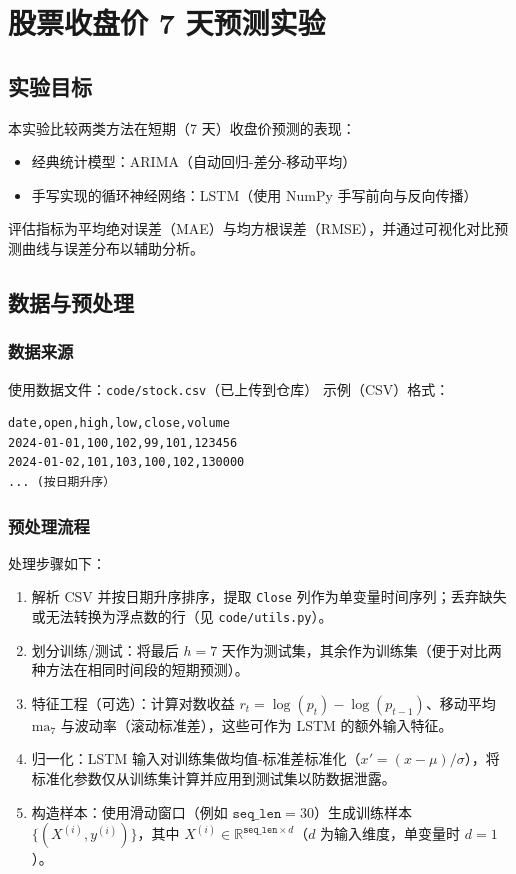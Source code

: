 \chapter{股票收盘价 7 天预测实验}

\section{实验目标}
本实验比较两类方法在短期（7 天）收盘价预测的表现：
\begin{itemize}
    \item 经典统计模型：ARIMA（自动回归-差分-移动平均）
    \item 手写实现的循环神经网络：LSTM（使用 NumPy 手写前向与反向传播）
\end{itemize}
评估指标为平均绝对误差（MAE）与均方根误差（RMSE），并通过可视化对比预测曲线与误差分布以辅助分析。

\section{数据与预处理}
\subsection{数据来源}
使用数据文件：\texttt{code/stock.csv}（已上传到仓库）
示例（CSV）格式：
\begin{lstlisting}[style=cleanpython]
date,open,high,low,close,volume
2024-01-01,100,102,99,101,123456
2024-01-02,101,103,100,102,130000
... (按日期升序）    
\end{lstlisting}

\subsection{预处理流程}
处理步骤如下：
\begin{enumerate}
    \item 解析 CSV 并按日期升序排序，提取 \texttt{Close} 列作为单变量时间序列；丢弃缺失或无法转换为浮点数的行（见 \texttt{code/utils.py}）。
    \item 划分训练/测试：将最后 $h=7$ 天作为测试集，其余作为训练集（便于对比两种方法在相同时间段的短期预测）。
    \item 特征工程（可选）：计算对数收益 $r_t=\log(p_t)-\log(p_{t-1})$、移动平均 $\mathrm{ma}_7$ 与波动率（滚动标准差），这些可作为 LSTM 的额外输入特征。
    \item 归一化：LSTM 输入对训练集做均值-标准差标准化（$x'=(x-\mu)/\sigma$），将标准化参数仅从训练集计算并应用到测试集以防数据泄露。
    \item 构造样本：使用滑动窗口（例如 $\texttt{seq\_len}=30$）生成训练样本 $\{(X^{(i)}, y^{(i)})\}$，其中 $X^{(i)}\in\mathbb{R}^{\texttt{seq\_len}\times d}$（$d$ 为输入维度，单变量时 $d=1$）。
\end{enumerate}

